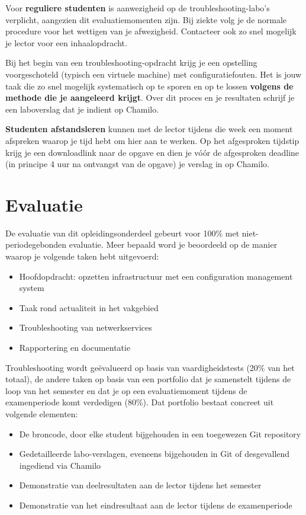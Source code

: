 Voor \textbf{reguliere studenten} is aanwezigheid op de troubleshooting-labo's verplicht, aangezien dit evaluatiemomenten zijn. Bij ziekte volg je de normale procedure voor het wettigen van je afwezigheid. Contacteer ook zo snel mogelijk je lector voor een inhaalopdracht.

Bij het begin van een troubleshooting-opdracht krijg je een opstelling voorgeschoteld (typisch een virtuele machine) met configuratiefouten. Het is jouw taak die zo snel mogelijk systematisch op te sporen en op te lossen \textbf{volgens de methode die je aangeleerd krijgt}. Over dit proces en je resultaten schrijf je een laboverslag dat je indient op Chamilo.

\textbf{Studenten afstandsleren} kunnen met de lector tijdens die week een moment afspreken waarop je tijd hebt om hier aan te werken. Op het afgesproken tijdstip krijg je een downloadlink naar de opgave en dien je vóór de afgesproken deadline (in principe 4 uur na ontvangst van de opgave) je verslag in op Chamilo.

\section{Evaluatie}%
\label{sec:evaluatie}

De evaluatie van dit opleidingsonderdeel gebeurt voor 100\% met niet-periodegebonden evaluatie. Meer bepaald word je beoordeeld op de manier waarop je volgende taken hebt uitgevoerd:

\begin{itemize}
  \item Hoofdopdracht: opzetten infrastructuur met een configuration management system
  \item Taak rond actualiteit in het vakgebied
  \item Troubleshooting van netwerkservices
  \item Rapportering en documentatie
\end{itemize}

Troubleshooting wordt geëvalueerd op basis van vaardigheidstests (20\% van het totaal), de andere taken op basis van een portfolio dat je samenstelt tijdens de loop van het semester en dat je op een evaluatiemoment tijdens de examenperiode komt verdedigen (80\%). Dat portfolio bestaat concreet uit volgende elementen:

\begin{itemize}
  \item De broncode, door elke student bijgehouden in een toegewezen Git repository
  \item Gedetailleerde labo-verslagen, eveneens bijgehouden in Git of desgevallend ingediend via Chamilo
  \item Demonstratie van deelresultaten aan de lector tijdens het semester
  \item Demonstratie van het eindresultaat aan de lector tijdens de examenperiode
\end{itemize}

